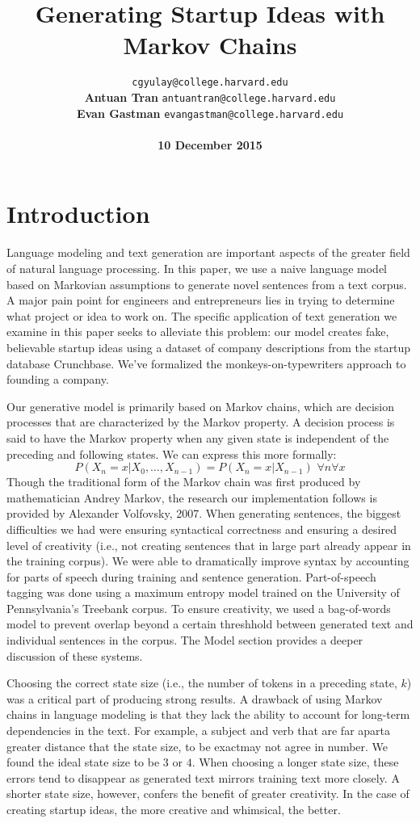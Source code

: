 \documentclass[11pt]{article}
\title{Generating Startup Ideas with Markov Chains}
\author{
  \noindent\makebox[0.49\textwidth][l]{\textbf{Colton Gyulay}} \hfill
  \texttt{cgyulay@college.harvard.edu}\\
  \textbf{Antuan Tran} \hfill
  \texttt{antuantran@college.harvard.edu}\\
  \textbf{Evan Gastman} \hfill
  \texttt{evangastman@college.harvard.edu}\\\\
  \textbf{10 December 2015} \hfill \textbf{} %
}
\begin{document}
\date{}
\maketitle{}

\section{Introduction}

Language modeling and text generation are important aspects of the greater
field of natural language processing. In this paper, we use a naive language
model based on Markovian assumptions to generate novel sentences from a text
corpus. A major pain point for engineers and entrepreneurs lies in trying to
determine what project or idea to work on. The specific application of text
generation we examine in this paper seeks to alleviate this problem: our model creates fake, believable startup ideas using a dataset of company descriptions from the startup database Crunchbase. We've formalized the monkeys-on-typewriters approach to founding a company.

Our generative model is primarily based on Markov chains, which are decision
processes that are characterized by the Markov property. A decision process is said to have the Markov property when any given state is independent of the preceding and following states. We can express this more formally:
\[P(X_n = x|X_0,\dots,X_{n-1}) =P(X_n = x|X_{n-1})\,\,\forall{n}\forall{x}\]
Though the traditional form of the Markov chain was first produced by mathematician Andrey Markov, the research our implementation follows is
provided by Alexander Volfovsky, 2007.\cite{volfovsky2007} When generating sentences, the biggest difficulties we had were ensuring syntactical correctness and ensuring a desired level of creativity (i.e., not creating sentences that in large part already appear in the training corpus). We were able to dramatically improve syntax by accounting for parts of speech during training and sentence generation. Part-of-speech tagging was done using a maximum entropy model
trained on the University of Pennsylvania's Treebank corpus.\cite{ratnaparkhi1996} To ensure creativity, we used a bag-of-words model to prevent overlap beyond a certain threshhold between generated text and individual sentences in the corpus. The Model section provides a deeper discussion of these systems.

Choosing the correct state size (i.e., the number of tokens in a preceding state, \(k\)) was a critical part of producing strong results. A drawback of using Markov chains in language modeling is that they lack the ability to account for long-term dependencies in the text. For example, a subject and verb that are far apart\textemdash a greater distance that the state size, to be exact\textemdash may not agree in number. We found the ideal state size to be \(3\) or \(4\). When choosing a longer state size, these errors tend to disappear as generated text mirrors training text more closely. A shorter state size, however, confers the benefit of greater creativity. In the case of creating startup ideas, the more creative and whimsical, the better.
\end{document}
